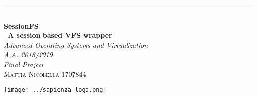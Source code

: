 %
%
%
%
%
%
%



\newcommand*{\plogo}{\texttt{[image: ../sapienza-logo.png]}} %



\begin{titlepage} %

	\raggedleft %

	\rule{1pt}{\textheight} %
	\hspace{0.05\textwidth} %
	\parbox[b]{0.75\textwidth}{ %
	\\
		{\Huge\bfseries SessionFS \\[0.5\baselineskip] ~A session based VFS wrapper}\\[2\baselineskip] %
		{\large\textit{Advanced Operating Systems and Virtualization \\ A.A. 2018/2019 \\ Final Project}}\\[4\baselineskip] %
		{\Large\textsc{Mattia Nicolella 1707844}} %

		\vspace{0.5\textheight} %

		{\plogo}\\[\baselineskip] %
	}

\end{titlepage}


